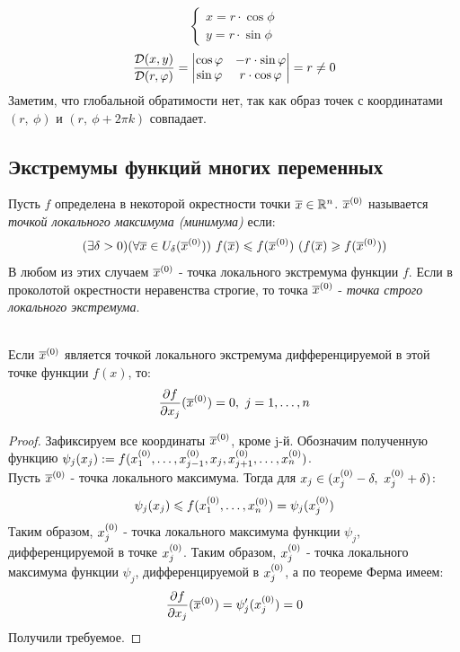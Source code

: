 \begin{example}
	\begin{equation*}
		\begin{cases}
			x=r\cdot\cos\phi\\
			y=r\cdot\sin\phi
		\end{cases}
	\end{equation*}
	\[\frac{\mathcal D(x,y)}{\mathcal D(r,\varphi)}=
	\begin{vmatrix}
		\cos\varphi & -r\cdot\sin\varphi \\
		\sin\varphi & r\cdot\cos\varphi
	\end{vmatrix}
	=r\ne0
	\]
	Заметим, что глобальной обратимости нет, так как образ точек с координатами $(r,\ \phi)$ и $(r,\ \phi+2\pi k)$ совпадает.
\end{example}
\subsection{Экстремумы функций многих переменных}
\begin{definition}
	Пусть $f$ определена в некоторой окрестности точки $\overline x\in\mathbb{R}^n$. $\overline x^{({0})}$ называется \textit{точкой локального максимума (минимума)} если:
	\[(\ex\delta>0)(\fa\vx\in U_\delta(\vx\n))\ f(\vx)\le f(\vx\n)\ (f(\vx)\ge f(\vx\n))\]
	В любом из этих случаем $\overline x^{({0})}$ - точка локального экстремума функции $f$. Если в проколотой окрестности неравенства строгие, то точка $\overline x^{({0})}$ - \textit{точка строго локального экстремума}.
\end{definition}
\begin{theorem}\label{27_th1}\\
	Если $\overline x^{({0})}$ является точкой локального экстремума дифференцируемой в этой точке функции $f(x)$, то:
	\[\frac{\vd f}{\vd x_j}(\vx\n)=0,\ j=1,\dots,n\]
\end{theorem}
\begin{proof}
	Зафиксируем все координаты $\overline x^{({0})}$, кроме j-й. Обозначим полученную функцию $\psi_j(x_j):=f(x_1^{({0})},\dots,x_{j-1}^{({0})},x_j,x_{j+1}^{({0})},\dots,x_n^{({0})})$. \\
	Пусть $\overline x^{({0})}$ - точка локального максимума. Тогда для $x_j\in(x_j\n-\delta,\ x_j\n+\delta)$:
	\[\psi_j(x_j)\leqslant f(x_1^{({0})},\dots,x_n^{({0})})=\psi_j(x_j^{({0})})\]
	Таким образом, $x_j^{({0})}$ - точка локального максимума функции $\psi_j$, дифференцируемой в точке $x_j^{({0})}$. Таким образом, $x_j^{({0})}$ - точка локального максимума функции $\psi_j$, дифференцируемой в $x_j^{({0})}$, а по теореме Ферма имеем:
	\[\frac{\partial f}{\partial x_j}(\overline x^{({0})})=\psi_j'(x_j^{({0})})=0\]
	Получили требуемое.
\end{proof}
